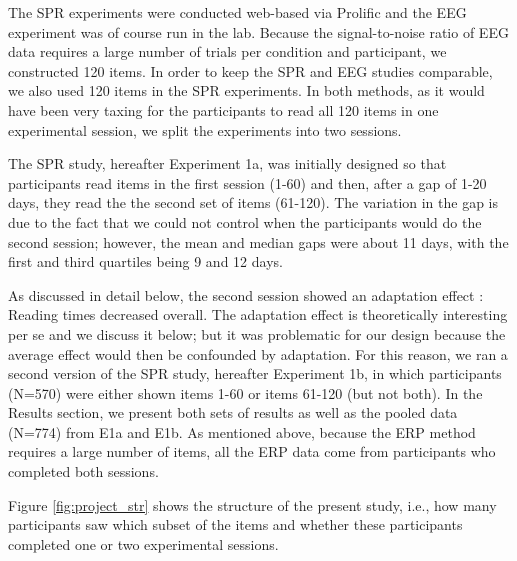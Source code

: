 \documentclass[a4paper, man, floatsintext]{apa7}
\begin{document}
The SPR experiments were conducted web-based via Prolific and the EEG experiment was of course run in the lab.  Because the signal-to-noise ratio of EEG data requires a large number of trials per condition and participant, we constructed 120 items. In order to keep the SPR and EEG studies comparable, we also used 120 items in the SPR experiments. In both methods, as it would have been very taxing for the participants to read all 120 items in one experimental session, we split the experiments into two sessions. 

The SPR study, hereafter Experiment 1a, was initially designed so that participants read items in the first session (1-60) and then, after a gap of 1-20 days, they read the the second set of items (61-120). The variation in the gap is due to the fact that we could not control when the participants would do the second session; however, the mean and median gaps were  about 11 days, with the first and third quartiles being 9 and 12 days.

As discussed in detail below, the second session showed an adaptation effect \parencite{prasad2021rapid}: Reading times decreased overall. The adaptation effect is theoretically interesting per se \parencite{fine2013rapid} and we discuss it below; but it was problematic for our design because the average effect would then be confounded by adaptation. For this reason, we ran a second version of the SPR study, hereafter Experiment 1b, in which participants (N=570) were either shown items 1-60 or items 61-120 (but not both). In the Results section, we present both sets of results as well as the pooled data (N=774) from E1a and E1b.
As mentioned above, because the ERP method requires a large number of items, all the ERP data come from participants who completed both sessions. 

Figure \ref{fig:project_str} shows the structure of the present study, i.e., how many participants saw which subset of the items and whether these participants completed one or two experimental sessions.
\end{document}
